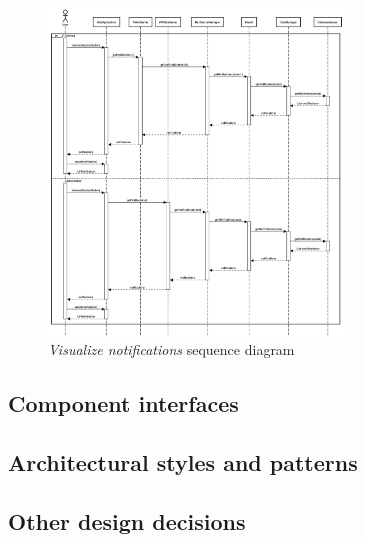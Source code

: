 \begin{enumerate}
\begin{figure}[H]
\begin{center}
        \includegraphics[width=0.7\textwidth]{sequance/viewNotifications.png}
        \caption{\emph{Visualize notifications} sequence diagram}
        \label{fig:sequence9}
        \end{center}
    \end{figure}
    
\end{enumerate}

\subsection{Component interfaces}



\subsection{Architectural styles and patterns}

\subsection{Other design decisions}

